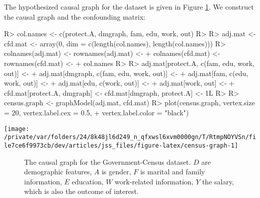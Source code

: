 \documentclass[
  notitle]{jss}
\begin{document}
The hypothesized causal graph for the dataset is given in Figure
\ref{fig:censusgraph}. We construct the causal graph and the confounding
matrix:

\begin{CodeChunk}
\begin{CodeInput}
R> col.names <- c(protect.A, dmgraph, fam, edu, work, out)
R> 
R> adj.mat <- cfd.mat <- array(0, dim = c(length(col.names), length(col.names)))
R> colnames(adj.mat) <- rownames(adj.mat) <-
+   colnames(cfd.mat) <- rownames(cfd.mat) <-
+   col.names
R> 
R> adj.mat[protect.A, c(fam, edu, work, out)] <-
+   adj.mat[dmgraph, c(fam, edu, work, out)] <-
+   adj.mat[fam, c(edu, work, out)] <-
+   adj.mat[edu, c(work, out)] <-
+   adj.mat[work, out] <-
+   cfd.mat[protect.A, dmgraph] <- cfd.mat[dmgraph, protect.A] <- 1L
R> 
R> census.graph <- graphModel(adj.mat, cfd.mat)
R> plot(census.graph, vertex.size = 20, vertex.label.cex = 0.5,
+   vertex.label.color = "black")
\end{CodeInput}


\begin{center}\texttt{[image: /private/var/folders/24/8k48jl6d249\_n\_qfxwsl6xvm0000gn/T/RtmpNOYVSn/file7ce6f9973cb/dev/articles/jss\_files/figure-latex/census-graph-1]} \end{center}

\end{CodeChunk}

\begin{figure} \centering
    \caption{The causal graph for the Government-Census dataset. $D$ are demographic features, $A$ is gender, $F$ is marital and family information, $E$ education, $W$ work-related information, $Y$ the salary, which is also the outcome of interest.}
    \label{fig:censusgraph}
\end{figure}
\end{document}
